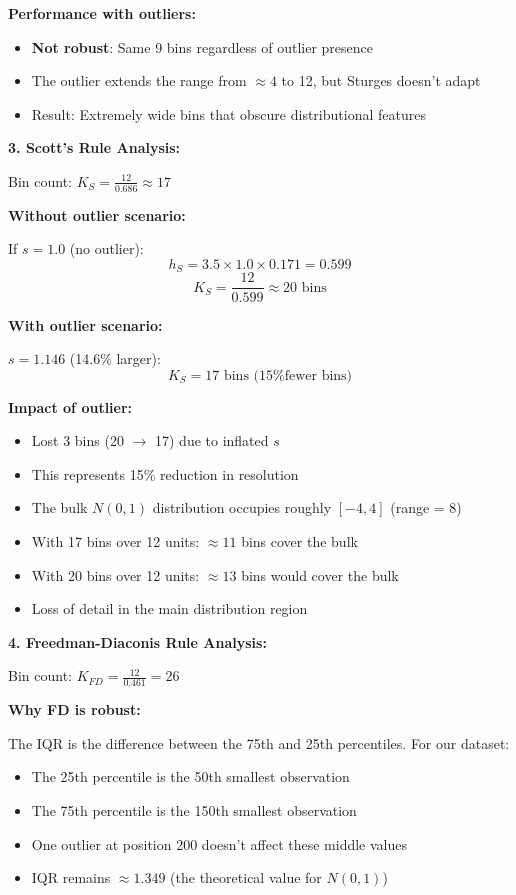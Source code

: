 \documentclass[12pt]{article}
\begin{document}
\begin{explanation}
\textbf{Performance with outliers:}
\begin{itemize}
    \item \textbf{Not robust}: Same 9 bins regardless of outlier presence
    \item The outlier extends the range from \(\approx 4\) to 12, but Sturges doesn't adapt
    \item Result: Extremely wide bins that obscure distributional features
\end{itemize}

\textbf{3. Scott's Rule Analysis:}

Bin count: \(K_S = \frac{12}{0.686} \approx 17\)

\textbf{Without outlier scenario:}

If \(s = 1.0\) (no outlier):
\[
h_S = 3.5 \times 1.0 \times 0.171 = 0.599
\]
\[
K_S = \frac{12}{0.599} \approx 20 \text{ bins}
\]

\textbf{With outlier scenario:}

\(s = 1.146\) (14.6\% larger):
\[
K_S = 17 \text{ bins (15\% fewer bins)}
\]

\textbf{Impact of outlier:}
\begin{itemize}
    \item Lost 3 bins (20 \(\to\) 17) due to inflated \(s\)
    \item This represents 15\% reduction in resolution
    \item The bulk \(N(0,1)\) distribution occupies roughly \([-4, 4]\) (range = 8)
    \item With 17 bins over 12 units: \(\approx 11\) bins cover the bulk
    \item With 20 bins over 12 units: \(\approx 13\) bins would cover the bulk
    \item Loss of detail in the main distribution region
\end{itemize}

\textbf{4. Freedman-Diaconis Rule Analysis:}

Bin count: \(K_{FD} = \frac{12}{0.461} = 26\)

\textbf{Why FD is robust:}

The IQR is the difference between the 75th and 25th percentiles. For our dataset:
\begin{itemize}
    \item The 25th percentile is the 50th smallest observation
    \item The 75th percentile is the 150th smallest observation
    \item One outlier at position 200 doesn't affect these middle values
    \item IQR remains \(\approx 1.349\) (the theoretical value for \(N(0,1)\))
\end{itemize}


\end{explanation}
\end{document}
